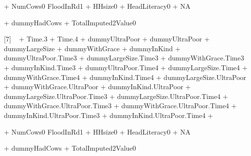\begin{Schunk}
\begin{Soutput}
 + NumCows0
FloodInRd1 + HHsize0 + HeadLiteracy0 + NA

 + dummyHadCows
 + TotalImputed2Value0 

[7]
 ~  + Time.3 + Time.4 + dummyUltraPoor
 + dummyUltraPoor + dummyLargeSize + dummyWithGrace
 + dummyInKind + dummyUltraPoor.Time3 + dummyLargeSize.Time3
 + dummyWithGrace.Time3 + dummyInKind.Time3 + dummyUltraPoor.Time4
 + dummyLargeSize.Time4 + dummyWithGrace.Time4 + dummyInKind.Time4
 + dummyLargeSize.UltraPoor + dummyWithGrace.UltraPoor + dummyInKind.UltraPoor
 + dummyLargeSize.UltraPoor.Time3 + dummyLargeSize.UltraPoor.Time4 + dummyWithGrace.UltraPoor.Time3
 + dummyWithGrace.UltraPoor.Time4 + dummyInKind.UltraPoor.Time3 + dummyInKind.UltraPoor.Time4
 + 

 + NumCows0
FloodInRd1 + HHsize0 + HeadLiteracy0 + NA

 + dummyHadCows
 + TotalImputed2Value0 
\end{Soutput}
\end{Schunk}



